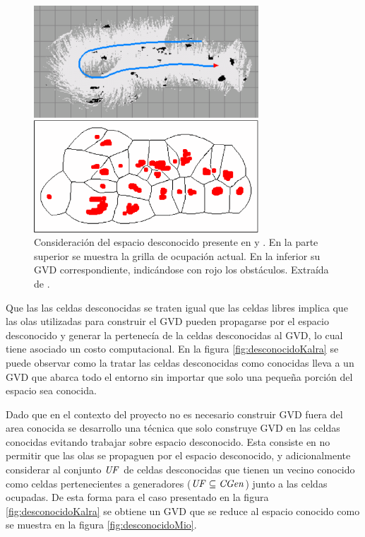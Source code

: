 \begin{figure}[H]
  \centerfloat

  \includegraphics[clip=true, width=0.75\textwidth]{imagenes/desconocidoCons/kalraOG.png}

  \caption[Consideración del espacio desconocido presente en \cite{kalra2009incremental} y \cite{Lau2013}.]{Consideración del espacio desconocido presente en \cite{kalra2009incremental} y \cite{Lau2013}. En la parte superior se muestra la grilla de ocupación actual. En la inferior su GVD correspondiente, indicándose con rojo los obstáculos. Extraída de \cite{kalra2009incremental}.}\label{fig:kalraOG}
\end{figure}

Que las las celdas desconocidas se traten igual que las celdas libres implica
que las olas utilizadas para construir el GVD pueden propagarse por el espacio
desconocido y generar la pertenecía de la celdas desconocidas al GVD, lo cual
tiene asociado un costo computacional.
En la figura \ref{fig:desconocidoKalra} se puede observar como la tratar las
celdas desconocidas como conocidas lleva a un GVD que abarca todo el entorno
sin importar que solo una pequeña porción del espacio sea conocida. 


Dado que en el contexto del proyecto no es necesario construir GVD fuera del
area conocida se desarrollo una técnica que solo construye GVD en las celdas
conocidas evitando trabajar sobre espacio desconocido. Esta consiste en no
permitir que las olas se propaguen por el espacio desconocido, y
adicionalmente considerar al conjunto $\mathit{UF}$ de celdas desconocidas que tienen un
vecino conocido como celdas pertenecientes a generadores
($\mathit{UF}\subseteq \mathit{CGen}$) junto a las celdas ocupadas.
De esta forma para el caso presentado en la figura \ref{fig:desconocidoKalra}
se obtiene un GVD que se reduce al espacio conocido como se muestra en la
figura \ref{fig:desconocidoMio}.

